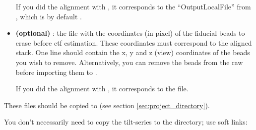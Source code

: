 \begin{itemize}
    If you did the alignment with {\ETomo}, it corresponds to the ``OutputLocalFile'' from {\tiltalign}, which is by default .
    
    \item \textbf{(optional)} : the file with the coordinates (in pixel) of the fiducial beads to erase before ctf estimation. These coordinates must correspond to the aligned stack. One line should contain the x, y and z (view) coordinates of the beads you wish to remove. Alternatively, you can remove the beads from the raw  before importing them to {\emClarity}.
    
    If you did the alignment with {\ETomo}, it corresponds to the  file.
\end{itemize}

These files should be copied to  (see section \ref{sec:project_directory}).

\begin{tip}You don't necessarily need to copy the tilt-series to the  directory; use soft links: \end{tip}
